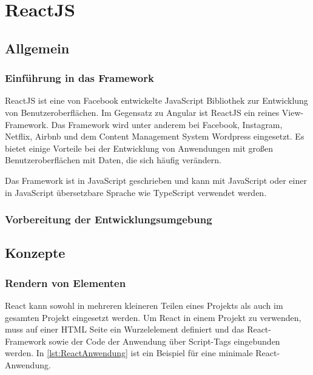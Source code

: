 \chapter{ReactJS}
\label{ch:reactJS}

\section{Allgemein}

\subsection{Einführung in das Framework}

ReactJS ist eine von Facebook entwickelte JavaScript Bibliothek zur Entwicklung von Benutzeroberflächen. Im Gegensatz zu Angular ist ReactJS ein reines View-Framework. Das Framework wird unter anderem bei Facebook, Instagram, Netflix, Airbnb und dem Content Management System Wordpress eingesetzt. Es bietet einige Vorteile bei der Entwicklung von Anwendungen mit großen Benutzeroberflächen mit Daten, die sich häufig verändern. 

Das Framework ist in JavaScript geschrieben und kann mit JavaScript oder einer in JavaScript übersetzbare Sprache wie TypeScript verwendet werden.\autocites[vgl.][1\psqq]{Gackenheimer.2015}[vgl.][3\psqq]{Zeigermann.2016}


\subsection{Vorbereitung der Entwicklungsumgebung}





\section{Konzepte}

\subsection{Rendern von Elementen}
React kann sowohl in mehreren kleineren Teilen eines Projekts als auch im gesamten Projekt eingesetzt werden. Um React in einem Projekt zu verwenden, muss auf einer HTML Seite ein Wurzelelement definiert und das React-Framework sowie der Code der Anwendung über Script-Tags eingebunden werden. In \autoref{lst:ReactAnwendung} ist ein Beispiel für eine minimale React-Anwendung. 

